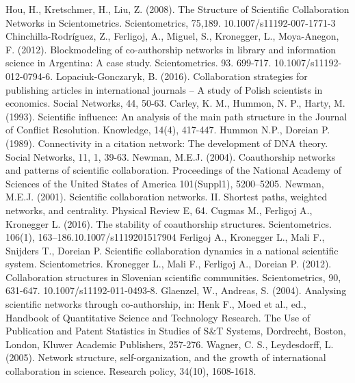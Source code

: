 \documentclass[11pt]{article} %
\begin{document}
\begin{thebibliography}{99}
   Hou, H., Kretschmer, H., Liu, Z. (2008). The Structure of Scientific Collaboration Networks in Scientometrics. Scientometrics, 75,189. 10.1007/s11192-007-1771-3 
   Chinchilla-Rodríguez, Z., Ferligoj, A., Miguel, S., Kronegger, L., Moya-Anegon, F. (2012). Blockmodeling of co-authorship networks in library and information science in Argentina: A case study. Scientometrics. 93. 699-717. 10.1007/s11192-012-0794-6.
   Lopaciuk-Gonczaryk, B. (2016). Collaboration strategies for publishing articles in international journals – A study of Polish scientists in economics. Social Networks, 44, 50-63.
   Carley, K. M., Hummon, N. P., Harty, M. (1993). Scientific influence: An analysis of the main path structure in the Journal of Conflict Resolution. Knowledge, 14(4), 417-447.
   Hummon N.P., Doreian P.(1989). Connectivity in a citation network: The development of DNA theory. Social Networks, 11, 1, 39-63. 
   Newman, M.E.J. (2004). Coauthorship networks and patterns of scientific collaboration. Proceedings of the National Academy of Sciences of the United States of America 101(Suppl1), 5200–5205. 
   Newman, M.E.J. (2001). Scientific collaboration networks. II. Shortest paths, weighted networks, and centrality. Physical Review E, 64. 
   Cugmas M., Ferligoj A., Kronegger L. (2016). The stability of coauthorship structures. Scientometrics. 106(1), 163–186.10.1007/s1119201517904
   Ferligoj A., Kronegger L., Mali F., Snijders T., Doreian P. Scientific collaboration dynamics in a national scientific system. Scientometrics.
   Kronegger L., Mali F., Ferligoj A., Doreian P. (2012). Collaboration structures in Slovenian scientific communities. Scientometrics, 90, 631-647. 10.1007/s11192-011-0493-8. 
   Glaenzel, W., Andreas, S. (2004). Analysing scientific networks through co-authorship, in: Henk F., Moed et al., ed., Handbook of Quantitative Science and Technology Research. The Use of Publication and Patent Statistics in Studies of S\&T Systems, Dordrecht, Boston, London, Kluwer Academic Publishers, 257-276.
   Wagner, C. S.,  Leydesdorff, L. (2005). Network structure, self-organization, and the growth of international collaboration in science. Research policy, 34(10), 1608-1618.

\end{thebibliography}
\end{document}
